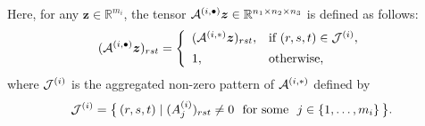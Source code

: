\documentclass[10pt]{article}
\newcommand{\magenta}[1]{\begin{color}{magenta}#1\end{color}}
\newcommand{\cJ}{{\cal J}}
\newcommand{\cA}{{\cal A}}
\newcommand{\R}{\mathbb R}
\newtheorem{remark}{Remark}
\begin{document}
Here, for any $\bm{z}\in\R^{m_i}$, the tensor $\cA^{(i,\bullet)}\bm{z}\in \R^{n_1\times n_2\times n_3}$ is defined as follows:
\begin{equation*}
(\cA^{(i,\bullet)}\bm{z})_{rst}
= \left\{\begin{array}{ll}
(\cA^{(i,*)}\bm{z} )_{rst}, &\mbox{if $(r,s,t)\in\cJ^{(i)}$}, \\[5pt]
1, &\mathrm{otherwise},
\end{array}\right.
\end{equation*}
where $\cJ^{(i)}$ is the aggregated non-zero pattern of $\cA^{(i,*)}$ defined by
\begin{equation}\label{nnzpa}
\cJ^{(i)} = \big\{\,(r,s,t) \mid (A^{(i)}_j)_{rst}\neq0 ~~\mathrm{for~some}~~j \in\{ 1,\dots,m_i\}\,\big\}.
\end{equation}


\end{document}
